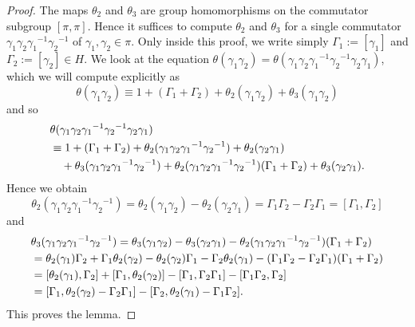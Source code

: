 \documentclass[a4paper,12pt, twoside]{amsart}
\theoremstyle{definition}
\theoremstyle{remark}
\numberwithin{equation}{section}
\newcommand\inv{^{-1}}
\begin{document}
\begin{proof} The maps $\theta_2$ and $\theta_3$ are group homomorphisms on the commutator subgroup $[\pi, \pi]$. Hence it suffices to compute $\theta_2$ and $\theta_3$ for a single commutator $\gamma_1\gamma_2{\gamma_1}\inv{\gamma_2}\inv$ of $\gamma_1, \gamma_2 \in \pi$. 
Only inside this proof, we write simply $\Gamma_1 := [\gamma_1]$ and $\Gamma_2 := [\gamma_2] \in H$. 
We look at the equation $\theta(\gamma_1\gamma_2) = \theta(\gamma_1\gamma_2{\gamma_1}\inv{\gamma_2}\inv\gamma_2\gamma_1)$, which we will compute explicitly as 
$$
\theta(\gamma_1\gamma_2) \equiv 
1 + (\Gamma_1+\Gamma_2) + \theta_2(\gamma_1\gamma_2) + \theta_3(\gamma_1\gamma_2)
$$
and so 
$$
\aligned
&\theta(\gamma_1\gamma_2{\gamma_1}\inv{\gamma_2}\inv\gamma_2\gamma_1)\\
& \equiv 1+ (\Gamma_1 + \Gamma_2) 
+ \theta_2(\gamma_1\gamma_2{\gamma_1}\inv{\gamma_2}\inv) +\theta_2(\gamma_2\gamma_1)\\
&\quad + \theta_3(\gamma_1\gamma_2{\gamma_1}\inv{\gamma_2}\inv) 
+ \theta_2(\gamma_1\gamma_2{\gamma_1}\inv{\gamma_2}\inv)(\Gamma_1+\Gamma_2)
+\theta_3(\gamma_2\gamma_1).
\endaligned
$$
Hence we obtain 
\begin{equation*}\label{eq:theta2}
\theta_2(\gamma_1\gamma_2{\gamma_1}\inv{\gamma_2}\inv) 
= \theta_2(\gamma_1\gamma_2) - \theta_2(\gamma_2\gamma_1)
= \Gamma_1\Gamma_2 - \Gamma_2\Gamma_1
= [\Gamma_1, \Gamma_2]
\end{equation*}
and 
\begin{equation*}\label{eq:theta3}
\aligned
&\theta_3(\gamma_1\gamma_2{\gamma_1}\inv{\gamma_2}\inv) 
= \theta_3(\gamma_1\gamma_2) - \theta_3(\gamma_2\gamma_1)
- \theta_2(\gamma_1\gamma_2{\gamma_1}\inv{\gamma_2}\inv)(\Gamma_1+\Gamma_2)\\
&= \theta_2(\gamma_1)\Gamma_2 + \Gamma_1\theta_2(\gamma_2)
- \theta_2(\gamma_2)\Gamma_1 - \Gamma_2\theta_2(\gamma_1)
-(\Gamma_1\Gamma_2 - \Gamma_2\Gamma_1)(\Gamma_1+\Gamma_2)\\
&= [\theta_2(\gamma_1), \Gamma_2] + [\Gamma_1, \theta_2(\gamma_2)]
- [\Gamma_1, \Gamma_2\Gamma_1] - [\Gamma_1\Gamma_2, \Gamma_2]\\
&= [\Gamma_1, \theta_2(\gamma_2) - \Gamma_2\Gamma_1]
- [\Gamma_2, \theta_2(\gamma_1) - \Gamma_1\Gamma_2].
\endaligned
\end{equation*}
This proves the lemma.
\end{proof}
\end{document}
